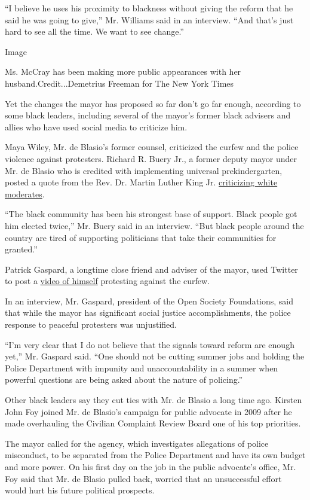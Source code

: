 ``I believe he uses his proximity to blackness without giving the reform
that he said he was going to give,'' Mr. Williams said in an interview.
``And that's just hard to see all the time. We want to see change.''

Image

Ms. McCray has been making more public appearances with her
husband.Credit...Demetrius Freeman for The New York Times

Yet the changes the mayor has proposed so far don't go far enough,
according to some black leaders, including several of the mayor's former
black advisers and allies who have used social media to criticize him.

Maya Wiley, Mr. de Blasio's former counsel, criticized the curfew and
the police violence against protesters. Richard R. Buery Jr., a former
deputy mayor under Mr. de Blasio who is credited with implementing
universal prekindergarten, posted a quote from the Rev. Dr. Martin
Luther King Jr.
\href{https://twitter.com/RichardBuery/status/1268583486178328576}{criticizing
white moderates}.

``The black community has been his strongest base of support. Black
people got him elected twice,'' Mr. Buery said in an interview. ``But
black people around the country are tired of supporting politicians that
take their communities for granted.''

Patrick Gaspard, a longtime close friend and adviser of the mayor, used
Twitter to post a
\href{https://twitter.com/patrickgaspard/status/1268321441541308417}{video
of himself} protesting against the curfew.

In an interview, Mr. Gaspard, president of the Open Society Foundations,
said that while the mayor has significant social justice
accomplishments, the police response to peaceful protesters was
unjustified.

``I'm very clear that I do not believe that the signals toward reform
are enough yet,'' Mr. Gaspard said. ``One should not be cutting summer
jobs and holding the Police Department with impunity and
unaccountability in a summer when powerful questions are being asked
about the nature of policing.''

Other black leaders say they cut ties with Mr. de Blasio a long time
ago. Kirsten John Foy joined Mr. de Blasio's campaign for public
advocate in 2009 after he made overhauling the Civilian Complaint Review
Board one of his top priorities.

The mayor called for the agency, which investigates allegations of
police misconduct, to be separated from the Police Department and have
its own budget and more power. On his first day on the job in the public
advocate's office, Mr. Foy said that Mr. de Blasio pulled back, worried
that an unsuccessful effort would hurt his future political prospects.

